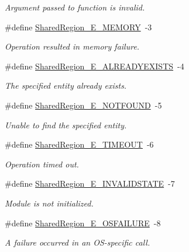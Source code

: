 \begin{DoxyCompactItemize}
\begin{DoxyCompactList}\small\item\em Argument passed to function is invalid. \end{DoxyCompactList}\item 
\#define \hyperlink{_shared_region_8h_a220eacf751625694d91a86b98c03dc8d}{Shared\-Region\-\_\-\-E\-\_\-\-M\-E\-M\-O\-R\-Y}~-\/3
\begin{DoxyCompactList}\small\item\em Operation resulted in memory failure. \end{DoxyCompactList}\item 
\#define \hyperlink{_shared_region_8h_a7df199a0327c8ba88ca03f73f4119815}{Shared\-Region\-\_\-\-E\-\_\-\-A\-L\-R\-E\-A\-D\-Y\-E\-X\-I\-S\-T\-S}~-\/4
\begin{DoxyCompactList}\small\item\em The specified entity already exists. \end{DoxyCompactList}\item 
\#define \hyperlink{_shared_region_8h_a6002cac7430e40aefe151274b1b3ec3b}{Shared\-Region\-\_\-\-E\-\_\-\-N\-O\-T\-F\-O\-U\-N\-D}~-\/5
\begin{DoxyCompactList}\small\item\em Unable to find the specified entity. \end{DoxyCompactList}\item 
\#define \hyperlink{_shared_region_8h_a030f39eb6a4dda552520aa2873bfd02b}{Shared\-Region\-\_\-\-E\-\_\-\-T\-I\-M\-E\-O\-U\-T}~-\/6
\begin{DoxyCompactList}\small\item\em Operation timed out. \end{DoxyCompactList}\item 
\#define \hyperlink{_shared_region_8h_a66763317d6f51467f6c52c6adfc226ac}{Shared\-Region\-\_\-\-E\-\_\-\-I\-N\-V\-A\-L\-I\-D\-S\-T\-A\-T\-E}~-\/7
\begin{DoxyCompactList}\small\item\em Module is not initialized. \end{DoxyCompactList}\item 
\#define \hyperlink{_shared_region_8h_adb57012556121d43f887d1930e0b26ef}{Shared\-Region\-\_\-\-E\-\_\-\-O\-S\-F\-A\-I\-L\-U\-R\-E}~-\/8
\begin{DoxyCompactList}\small\item\em A failure occurred in an O\-S-\/specific call. \end{DoxyCompactList}\item 

\end{DoxyCompactItemize}
